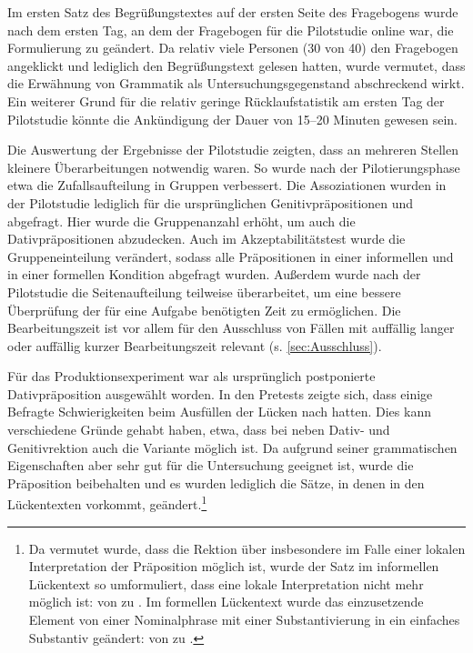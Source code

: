 Im ersten Satz des Begrüßungstextes auf der ersten Seite des Fragebogens wurde nach dem ersten Tag, an dem der Fragebogen für die Pilotstudie online war, die Formulierung  zu  geändert. Da relativ viele Personen (30 von 40) den Fragebogen angeklickt und lediglich den Begrüßungstext gelesen hatten, wurde vermutet, dass die Erwähnung von Grammatik als Untersuchungsgegenstand abschreckend wirkt. Ein weiterer Grund für die relativ geringe Rücklaufstatistik am ersten Tag der Pilotstudie könnte die Ankündigung der Dauer von 15--20 Minuten gewesen sein.

Die Auswertung der Ergebnisse der Pilotstudie zeigten, dass an mehreren Stellen kleinere Überarbeitungen notwendig waren. So wurde nach der Pilotierungsphase etwa die Zufallsaufteilung in Gruppen verbessert. Die Assoziationen wurden in der Pilotstudie lediglich für die ursprünglichen Genitivpräpositionen  und  abgefragt. Hier wurde die Gruppenanzahl erhöht, um auch die Dativpräpositionen abzudecken. Auch im Akzeptabilitätstest wurde die Gruppeneinteilung verändert, sodass alle Präpositionen in einer informellen und in einer formellen Kondition abgefragt wurden. Außerdem wurde nach der Pilotstudie die Seitenaufteilung teilweise überarbeitet, um eine bessere Überprüfung der für eine Aufgabe benötigten Zeit zu ermöglichen. Die Bearbeitungszeit ist vor allem für den Ausschluss von Fällen mit auffällig langer oder auffällig kurzer Bearbeitungszeit relevant (s. \autoref{sec:Ausschluss}). 

Für das Produktionsexperiment war als ursprünglich postponierte Dativpräposition  ausgewählt worden. In den Pretests zeigte sich, dass einige Befragte Schwierigkeiten beim Ausfüllen der Lücken nach  hatten. Dies kann verschiedene Gründe gehabt haben, etwa, dass bei  neben Dativ- und Genitivrektion auch die Variante  möglich ist. Da  aufgrund seiner grammatischen Eigenschaften aber sehr gut für die Untersuchung geeignet ist, wurde die Präposition beibehalten und es wurden lediglich die Sätze, in denen  in den Lückentexten vorkommt, geändert.\footnote{Da vermutet wurde, dass die Rektion über  insbesondere im Falle einer lokalen Interpretation der Präposition möglich ist, wurde der Satz im informellen Lückentext so umformuliert, dass eine lokale Interpretation nicht mehr möglich ist: von  zu . Im formellen Lückentext wurde das einzusetzende Element von einer Nominalphrase mit einer Substantivierung in ein einfaches Substantiv geändert: von  zu .} 
